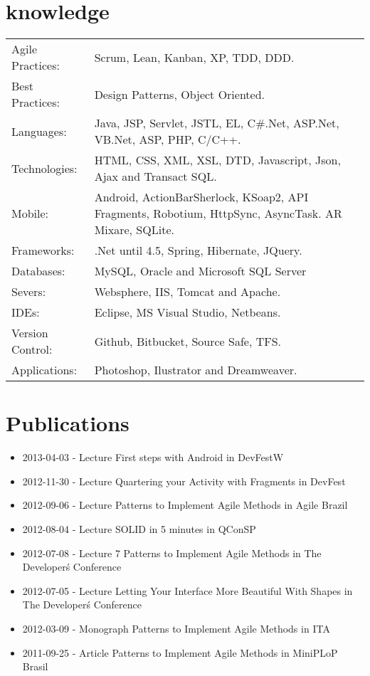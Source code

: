\documentclass[a4paper, oneside, final]{article}
\begin{document}
\begin{center}
\section{knowledge}

\begin{tabularx}{0.97\linewidth}{p{3.0cm}X}
Agile Practices: & Scrum, Lean, Kanban, XP, TDD, DDD.\\
Best Practices:  & Design Patterns, Object Oriented.\\
Languages:       & Java, JSP, Servlet, JSTL, EL, C\#.Net, ASP.Net, VB.Net, ASP, PHP, C/C++.\\
Technologies:    & HTML, CSS, XML, XSL, DTD, Javascript, Json, Ajax and Transact SQL.\\
Mobile:          & Android, ActionBarSherlock, KSoap2, API Fragments, Robotium, HttpSync, AsyncTask. AR Mixare, SQLite.\\
Frameworks:      & .Net until 4.5, Spring, Hibernate, JQuery.\\
Databases:       & MySQL, Oracle and Microsoft SQL Server \\
Severs:          & Websphere, IIS, Tomcat and Apache.\\
IDEs:            & Eclipse, MS Visual Studio, Netbeans.\\
Version Control: & Github, Bitbucket, Source Safe, TFS.\\
Applications:    & Photoshop, Ilustrator and Dreamweaver.\\
\end{tabularx}

\section{Publications}
\begin{itemize}
	\item 2013-04-03 - Lecture First steps with Android in DevFestW
	\item 2012-11-30 - Lecture Quartering your Activity with Fragments in DevFest
	\item 2012-09-06 - Lecture Patterns to Implement Agile Methods in Agile Brazil
	\item 2012-08-04 - Lecture SOLID in 5 minutes in QConSP
	\item 2012-07-08 - Lecture 7 Patterns to Implement Agile Methods in The Developer\'s Conference
	\item 2012-07-05 - Lecture Letting Your Interface More Beautiful With Shapes in The Developer\'s Conference
	\item 2012-03-09 - Monograph Patterns to Implement Agile Methods in ITA
	\item 2011-09-25 - Article Patterns to Implement Agile Methods in MiniPLoP Brasil
\end{itemize}


\end{center}
\end{document}
